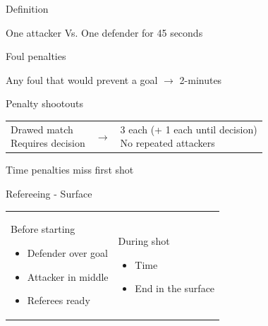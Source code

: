 \documentclass{beamer}
\begin{document}
	\begin{frame}{Definition}
		\begin{center}
			One attacker Vs. One defender for 45 seconds
		\end{center}
	\end{frame}

	\begin{frame}{Foul penalties}
		\begin{center}
			Any foul that would prevent a goal \pause $\rightarrow$ 2-minutes
		\end{center}
	\end{frame}

	\begin{frame}{Penalty shootouts}
		\begin{tabular}{lcl}
			\parbox{0.4\textwidth}
			{
				Drawed match \\
				Requires decision
				\pause
			}
			&
			$\rightarrow$
			&
			\parbox{0.4\textwidth}
			{
				3 each (+ 1 each until decision) \\
				No repeated attackers
			}
		\end{tabular}

		\pause

		\begin{center}
			Time penalties miss first shot
		\end{center}
	\end{frame}

	\begin{frame}{Refereeing - Surface}
		\begin{tabular}{ll}
			\parbox{0.5\textwidth}
			{
				\begin{center}
					Before starting
				\end{center}
				\begin{itemize}
					\item Defender over goal
					\item Attacker in middle
					\item Referees ready
				\end{itemize}
			}
			&
			\parbox{0.5\textwidth}
			{
				\begin{center}
					During shot
				\end{center}
				\begin{itemize}
					\item Time
					\item End in the surface
				\end{itemize}
			}
		\end{tabular}
	\end{frame}
\end{document}
